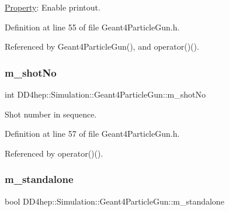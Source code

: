 \hyperlink{class_d_d4hep_1_1_property}{Property}\+: Enable printout. 



Definition at line 55 of file Geant4\+Particle\+Gun.\+h.



Referenced by Geant4\+Particle\+Gun(), and operator()().

\hypertarget{class_d_d4hep_1_1_simulation_1_1_geant4_particle_gun_a385166af11357b6ec06b835b4ee8cca6}{}\label{class_d_d4hep_1_1_simulation_1_1_geant4_particle_gun_a385166af11357b6ec06b835b4ee8cca6} 
\subsubsection{\texorpdfstring{m\+\_\+shot\+No}{m\_shotNo}}
{\footnotesize\ttfamily int D\+D4hep\+::\+Simulation\+::\+Geant4\+Particle\+Gun\+::m\+\_\+shot\+No\hspace{0.3cm}{\ttfamily [protected]}}



Shot number in sequence. 



Definition at line 57 of file Geant4\+Particle\+Gun.\+h.



Referenced by operator()().

\hypertarget{class_d_d4hep_1_1_simulation_1_1_geant4_particle_gun_af845ef9f13542031af0bf41b53a9f462}{}\label{class_d_d4hep_1_1_simulation_1_1_geant4_particle_gun_af845ef9f13542031af0bf41b53a9f462} 
\subsubsection{\texorpdfstring{m\+\_\+standalone}{m\_standalone}}
{\footnotesize\ttfamily bool D\+D4hep\+::\+Simulation\+::\+Geant4\+Particle\+Gun\+::m\+\_\+standalone\hspace{0.3cm}{\ttfamily [protected]}}



